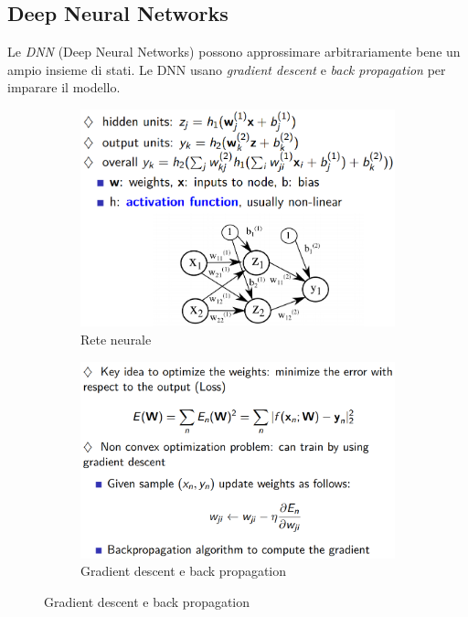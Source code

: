\documentclass[11pt,oneside]{book}
\begin{document}
\subsection{Deep Neural Networks}
Le \textit{DNN} (Deep Neural Networks) possono approssimare arbitrariamente bene un ampio insieme di stati. Le DNN usano \textit{gradient descent} e \textit{back propagation} per imparare il modello.
\begin{figure}[htp]
	\begin{subfigure}{0.49\textwidth}
	    \centering
		\includegraphics[width=\textwidth, height=\textheight, keepaspectratio]{dnn1.png}
		\caption{Rete neurale}
	\end{subfigure}
	\hfill
	\begin{subfigure}{0.49\textwidth}
	    \centering
		\includegraphics[width=\textwidth, height=\textheight, keepaspectratio]{dnn2.png}
		\caption{Gradient descent e back propagation}
	\end{subfigure}
\end{figure}
\end{document}
